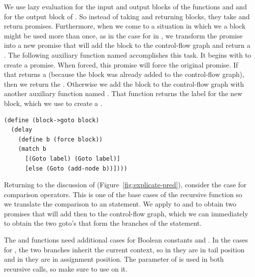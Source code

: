 \documentclass[11pt]{book}
\begin{document}
{We use lazy evaluation for the input and output blocks of the
functions  and  and for
the output block of . So instead of taking and
returning blocks, they take and return promises. Furthermore, when we
come to a situation in which we a block might be used more than once,
as in the case for  in , we transform
the promise into a new promise that will add the block to the
control-flow graph and return a .  The following auxiliary
function named  accomplishes this task. It begins
with  to create a promise. When forced, this promise will
force the original promise. If that returns a  (because the
block was already added to the control-flow graph), then we return the
. Otherwise we add the block to the control-flow graph with
another auxiliary function named . That function
returns the label for the new block, which we use to create a
.
\begin{lstlisting}
(define (block->goto block)
  (delay
    (define b (force block))
    (match b
      [(Goto label) (Goto label)]
      [else (Goto (add-node b))])))
\end{lstlisting}

Returning to the discussion of 
(Figure~\ref{fig:explicate-pred}), consider the case for comparison
operators. This is one of the base cases of the recursive function so
we translate the comparison to an  statement. We apply
 to  and  to obtain two promises
that will add then to the control-flow graph, which we can immediately
 to obtain the two goto's that form the branches of the
 statement.


The  and  functions need
additional cases for Boolean constants and .
%
In the cases for , the two branches inherit the current
context, so in  they are in tail position and in
 they are in assignment position. The
 parameter of  is used in both
recursive calls, so make sure to use  on it.

}
\end{document}

